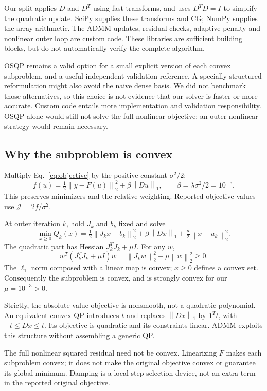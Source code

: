\documentclass[11pt,a4paper]{article}
\newcommand{\norm}[1]{\left\lVert#1\right\rVert}
\newcommand{\J}{\mathcal J}
\begin{document}
Our split applies $D$ and $D^T$ using fast transforms, and uses $D^TD=I$ to simplify the quadratic update. SciPy supplies these transforms and CG; NumPy supplies the array arithmetic. The ADMM updates, residual checks, adaptive penalty and nonlinear outer loop are custom code. These libraries are sufficient building blocks, but do not automatically verify the complete algorithm.

OSQP remains a valid option for a small explicit version of each convex subproblem, and a useful independent validation reference. A specially structured reformulation might also avoid the naive dense basis. We did not benchmark those alternatives, so this choice is not evidence that our solver is faster or more accurate. Custom code entails more implementation and validation responsibility. OSQP alone would still not solve the full nonlinear objective: an outer nonlinear strategy would remain necessary.
\clearpage
\subsection{Why the subproblem is convex}
Multiply Eq.~\eqref{eq:objective} by the positive constant $\sigma^2/2$:
\begin{equation}
 f(u)=\tfrac12\norm{y-F(u)}_2^2+\beta\norm{Du}_1,
 \qquad \beta=\lambda\sigma^2/2=10^{-5}.\label{eq:scaled}
\end{equation}
This preserves minimizers and the relative weighting. Reported objective values use $\J=2f/\sigma^2$.

At outer iteration $k$, hold $J_k$ and $b_k$ fixed and solve
\begin{equation}
 \min_{x\ge0} Q_k(x)=\tfrac12\norm{J_kx-b_k}_2^2
 +\beta\norm{Dx}_1+\tfrac\mu2\norm{x-u_k}_2^2.\label{eq:sub}
\end{equation}
The quadratic part has Hessian $J_k^TJ_k+\mu I$. For any $w$,
\[
 w^T(J_k^TJ_k+\mu I)w=\norm{J_kw}_2^2+\mu\norm{w}_2^2\ge0.
\]
The $\ell_1$ norm composed with a linear map is convex; $x\ge0$ defines a convex set. Consequently the subproblem is convex, and is strongly convex for our $\mu=10^{-3}>0$.

Strictly, the absolute-value objective is nonsmooth, not a quadratic polynomial. An equivalent convex QP introduces $t$ and replaces $\norm{Dx}_1$ by $\mathbf1^Tt$, with $-t\le Dx\le t$. Its objective is quadratic and its constraints linear. ADMM exploits this structure without assembling a generic QP.

The full nonlinear squared residual need not be convex. Linearizing $F$ makes each subproblem convex; it does not make the original objective convex or guarantee its global minimum. Damping is a local step-selection device, not an extra term in the reported original objective.
\clearpage
\end{document}
